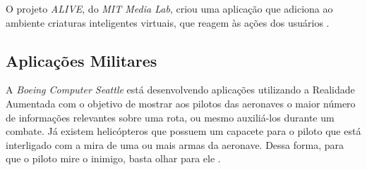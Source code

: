 O projeto \textit{ALIVE}, do \textit{MIT Media Lab}, criou uma aplicação que adiciona ao ambiente
criaturas inteligentes virtuais, que reagem às ações dos usuários \cite{ArtificialLife}.





\subsection{Aplicações Militares}


A \textit{Boeing Computer Seattle} está desenvolvendo aplicações utilizando a Realidade Aumentada com o objetivo
de mostrar aos pilotos das aeronaves o maior número de informações relevantes sobre uma rota, ou mesmo auxiliá-los 
durante um combate. Já existem helicópteros que possuem um capacete para o piloto que está interligado com a mira 
de uma ou mais armas da aeronave. Dessa forma, para que o piloto mire o inimigo, basta olhar para ele \cite{ARCADE}.











